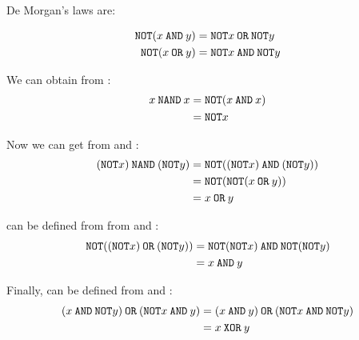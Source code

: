 \documentclass[12pt]{extarticle}
\begin{document}
De Morgan's laws are:

\begin{align*}
\boolnot (x \booland y) & = \boolnot x \boolor \boolnot y \\
\boolnot (x \boolor y) & = \boolnot x \booland \boolnot y
\end{align*}

We can obtain \boolnot from \boolnand:
\begin{align*}
x \boolnand x & = \boolnot (x \booland x) \\
& = \boolnot x
\end{align*}

Now we can get \boolor from \boolnand and \boolnot:
\begin{align*}
(\boolnot x) \boolnand (\boolnot y) & = \boolnot ((\boolnot x) \booland (\boolnot y)) \\
& = \boolnot (\boolnot (x \boolor y)) \\
& = x \boolor y
\end{align*}

\booland can be defined from from \boolnot and \boolor:
\begin{align*}
\boolnot((\boolnot x) \boolor (\boolnot y)) & = \boolnot(\boolnot x) \booland \boolnot(\boolnot y) \\
 & = x \booland y
\end{align*}

Finally, \boolxor can be defined from \booland and \boolor:
\begin{align*}
(x \booland \boolnot y) \boolor (\boolnot x \booland y) & = (x \booland y) \boolor (\boolnot x \booland \boolnot y) \\
& = x \boolxor y
\end{align*}


\end{document}
